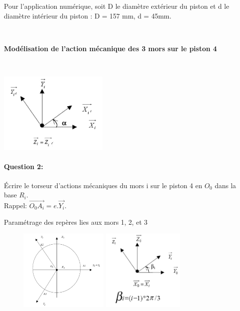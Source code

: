 Pour l'application numérique, soit D le diamètre extérieur du piston et d le diamètre intérieur du piston : D = 157 mm, d = 45mm. 

~\

\textbf{Modélisation de l'action mécanique des 3 mors sur le piston 4}

~\

  \begin{minipage}{0.35\linewidth}
  \centering\includegraphics[height=4cm]{img/param_man_2_2.png}
  \end{minipage}  \hfill
  \begin{minipage}{0.6\linewidth}
	\paragraph{Question 2:} Écrire le torseur d'actions mécaniques du mors i sur le piston 4 en $O_0$ dans la base $R_i$.\\
	Rappel: $\overrightarrow{O_0A_i}=e.\overrightarrow{Y_i}$.
  \end{minipage}

\newpage

Paramétrage des repères lies aux mors 1, 2, et 3 

\begin{figure}[!h]
  \begin{minipage}{0.48\linewidth}
  \centering\includegraphics[height=4cm]{img/param_man_1.png}
  \end{minipage}
  \begin{minipage}{0.48\linewidth}
  \centering\includegraphics[height=4cm]{img/param_man_2_1.png}
  \end{minipage}  \hfill
\end{figure}

